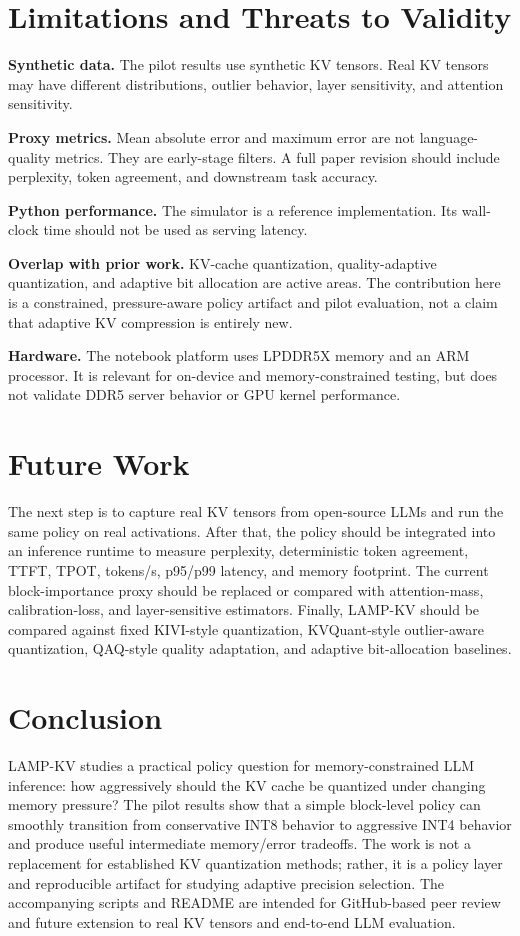 \documentclass[11pt]{article}
\begin{document}
\section{Limitations and Threats to Validity}
\textbf{Synthetic data.} The pilot results use synthetic KV tensors. Real KV tensors may have different distributions, outlier behavior, layer sensitivity, and attention sensitivity.

\textbf{Proxy metrics.} Mean absolute error and maximum error are not language-quality metrics. They are early-stage filters. A full paper revision should include perplexity, token agreement, and downstream task accuracy.

\textbf{Python performance.} The simulator is a reference implementation. Its wall-clock time should not be used as serving latency.

\textbf{Overlap with prior work.} KV-cache quantization, quality-adaptive quantization, and adaptive bit allocation are active areas. The contribution here is a constrained, pressure-aware policy artifact and pilot evaluation, not a claim that adaptive KV compression is entirely new.

\textbf{Hardware.} The notebook platform uses LPDDR5X memory and an ARM processor. It is relevant for on-device and memory-constrained testing, but does not validate DDR5 server behavior or GPU kernel performance.

\section{Future Work}
The next step is to capture real KV tensors from open-source LLMs and run the same policy on real activations. After that, the policy should be integrated into an inference runtime to measure perplexity, deterministic token agreement, TTFT, TPOT, tokens/s, p95/p99 latency, and memory footprint. The current block-importance proxy should be replaced or compared with attention-mass, calibration-loss, and layer-sensitive estimators. Finally, LAMP-KV should be compared against fixed KIVI-style quantization, KVQuant-style outlier-aware quantization, QAQ-style quality adaptation, and adaptive bit-allocation baselines.

\section{Conclusion}
LAMP-KV studies a practical policy question for memory-constrained LLM inference: how aggressively should the KV cache be quantized under changing memory pressure? The pilot results show that a simple block-level policy can smoothly transition from conservative INT8 behavior to aggressive INT4 behavior and produce useful intermediate memory/error tradeoffs. The work is not a replacement for established KV quantization methods; rather, it is a policy layer and reproducible artifact for studying adaptive precision selection. The accompanying scripts and README are intended for GitHub-based peer review and future extension to real KV tensors and end-to-end LLM evaluation.
\end{document}
